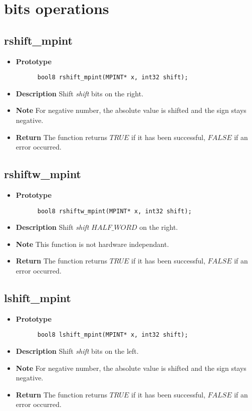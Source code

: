 \documentclass[10pt,a4paper]{article}
\begin{document}
  \section{bits operations}
  
  \subsection{rshift\_mpint}
  
  \begin{itemize}
    \item [] \textbf{Prototype}
    \begin{lstlisting}
      bool8 rshift_mpint(MPINT* x, int32 shift);
    \end{lstlisting}
    \item [] \textbf{Description} Shift \textit{shift} bits on the right.
    \item [] \textbf{Note} For negative number, the absolute value is shifted and the sign stays negative.
    \item [] \textbf{Return} The function returns $TRUE$ if it has been successful, $FALSE$ if an error occurred.
  \end{itemize}
  
  \subsection{rshiftw\_mpint}
  
  \begin{itemize}
    \item [] \textbf{Prototype}
    \begin{lstlisting}
      bool8 rshiftw_mpint(MPINT* x, int32 shift);
    \end{lstlisting}
    \item [] \textbf{Description} Shift \textit{shift} $HALF\_WORD$ on the right.
    \item [] \textbf{Note} This function is not hardware independant.
    \item [] \textbf{Return} The function returns $TRUE$ if it has been successful, $FALSE$ if an error occurred.
  \end{itemize}
  
  \subsection{lshift\_mpint}
  
  \begin{itemize}
    \item [] \textbf{Prototype}
    \begin{lstlisting}
      bool8 lshift_mpint(MPINT* x, int32 shift);
    \end{lstlisting}
    \item [] \textbf{Description} Shift \textit{shift} bits on the left.
    \item [] \textbf{Note} For negative number, the absolute value is shifted and the sign stays negative.
    \item [] \textbf{Return} The function returns $TRUE$ if it has been successful, $FALSE$ if an error occurred.
  \end{itemize}
  
\end{document}
